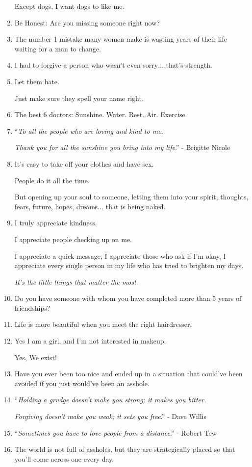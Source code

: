 \documentclass{article}
\begin{document}
\begin{enumerate}
	Except dogs, I want dogs to like me.
	\item Be Honest: Are you missing someone right now?
	\item The number 1 mistake many women make is wasting years of their life waiting for a man to change.
	\item I had to forgive a person who wasn't even sorry$\ldots$ that's strength.
	\item Let them hate.
	
	Just make sure they spell your name right.
	\item The best 6 doctors: Sunshine. Water. Rest. Air. Exercise.
	\item ``\textit{To all the people who are loving and kind to me.}
	
	\textit{Thank you for all the sunshine you bring into my life}.'' - Brigitte Nicole
	\item It's easy to take off your clothes and have sex.
	
	People do it all the time.
	
	But opening up your soul to someone, letting them into your spirit, thoughts, fears, future, hopes, dreams$\ldots$ that is being naked.
	\item I truly appreciate kindness.
	
	I appreciate people checking up on me.
	
	I appreciate a quick message, I appreciate those who ask if I'm okay, I appreciate every single person in my life who has tried to brighten my days.
	
	\textit{It's the little things that matter the most}.
	\item Do you have someone with whom you have completed more than 5 years of friendships?
	\item Life is more beautiful when you meet the right hairdresser.
	\item Yes I am a girl, and I'm not interested in makeup.
	
	Yes, We exist!
	\item Have you ever been too nice and ended up in a situation that could've been avoided if you just would've been an asshole.
	\item ``\textit{Holding a grudge doesn't make you strong; it makes you bitter.}
	
	\textit{Forgiving doesn't make you weak; it sets you free}.'' - Dave Willis
	\item ``\textit{Sometimes you have to love people from a distance}.'' - Robert Tew
	\item The world is not full of assholes, but they are strategically placed so that you'll come across one every day.
	

\end{enumerate}
\end{document}
